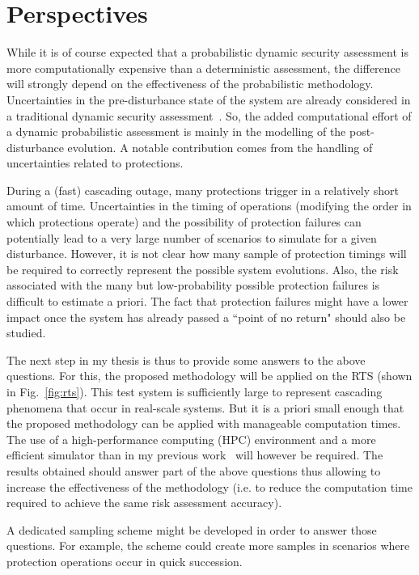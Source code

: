 \chapter{Perspectives}
\label{ch:perspectives}

While it is of course expected that a probabilistic dynamic security assessment is more computationally expensive than a deterministic assessment, the difference will strongly depend on the effectiveness of the probabilistic methodology. Uncertainties in the pre-disturbance state of the system are already considered in a traditional dynamic security assessment~\cite{EurostagHPC}. So, the added computational effort of a dynamic probabilistic assessment is mainly in the modelling of the post-disturbance evolution. A notable contribution comes from the handling of uncertainties related to protections.

During a (fast) cascading outage, many protections trigger in a relatively short amount of time. Uncertainties in the timing of operations (modifying the order in which protections operate) and the possibility of protection failures can potentially lead to a very large number of scenarios to simulate for a given disturbance. However, it is not clear how many sample of protection timings will be required to correctly represent the possible system evolutions. Also, the risk associated with the many but low-probability possible protection failures is difficult to estimate a priori. The fact that protection failures might have a lower impact once the system has already passed a ``point of no return" should also be studied.

The next step in my thesis is thus to provide some answers to the above questions. For this, the proposed methodology will be applied on the RTS (shown in Fig.~\ref{fig:rts}). This test system is sufficiently large to represent cascading phenomena that occur in real-scale systems. But it is a priori small enough that the proposed methodology can be applied with manageable computation times. The use of a high-performance computing (HPC) environment and a more efficient simulator than in my previous work~\cite{MCDETasTool} will however be required. The results obtained should answer part of the above questions thus allowing to increase the effectiveness of the methodology (i.e. to reduce the computation time required to achieve the same risk assessment accuracy).

A dedicated sampling scheme might be developed in order to answer those questions. For example, the scheme could create more samples in scenarios where protection operations occur in quick succession.

